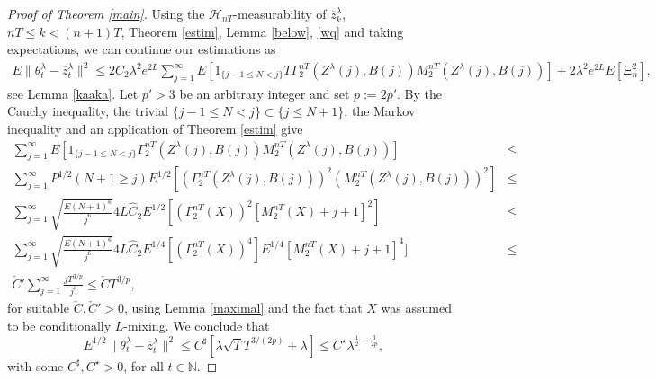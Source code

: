 \documentclass[a4paper]{article}
\begin{document}
\begin{proof}[ Proof of Theorem \ref{main}]
	
Using the $\mathcal{H}_{nT}$-measurability of $\overline{z}^{\lambda}_k$,
$nT\leq k<(n+1)T$, Theorem \ref{estim}, Lemma \ref{below}, \eqref{wq} and taking expectations, we can continue our estimations as
\begin{eqnarray*}
	E\| \theta^{\lambda}_{t}-\overline{z}^{\lambda}_{t}\|^2 \leq
	2\hat{C}_2\lambda^2 e^{2L}\sum_{j=1}^{\infty}E[1_{\{j-1\leq N <j\}}
	T\Gamma_2^{nT}(Z^{\lambda}(j),B(j))M_2^{nT}(Z^{\lambda}(j),B(j))] +	2\lambda^2 e^{2L}
	E\left[\Xi^2_{n}\right],
\end{eqnarray*}
see Lemma \ref{kaaka}. Let $p'>3$ be an arbitrary integer and set $p:=2p'$.
By the Cauchy inequality, the trivial $\{j-1\leq N < j\} \subset \{j\leq N+1\}$, the Markov inequality and
an application of Theorem \ref{estim} give
\begin{eqnarray*}
	\sum_{j=1}^{\infty}E[1_{\{j-1\leq N <j\}}
	\Gamma_2^{nT}(Z^{\lambda}(j),B(j))M_2^{nT}(Z^{\lambda}(j),B(j))] &\leq&\\
	\sum_{j=1}^{\infty} P^{1/2}(N+1\geq j)
	E^{1/2}[(\Gamma_2^{nT}(Z^{\lambda}(j),B(j)))^2(M_2^{nT}(Z^{\lambda}(j),B(j)))^2] &\leq&\\
	\sum_{j=1}^{\infty}\sqrt{\frac{E(N+1)^6}{j^6}}4L \hat{C}_2 E^{1/2}[(\Gamma^{nT}_2(X))^2  [M_2^{nT}(X)+j+1]^2] &\leq&\\
	\sum_{j=1}^{\infty}\sqrt{\frac{E(N+1)^6}{j^6}}4L \hat{C}_2
	E^{1/4}[(\Gamma^{nT}_2(X))^4]
	E^{1/4}[M_2^{nT}(X)+j+1]^4] &\leq&\\
	\check{C}'\sum_{j=1}^{\infty} \frac{jT^{3/p}}{j^3}
		\leq \check{C}T^{3/p},
\end{eqnarray*}
for suitable $\check{C}, \check{C}'>0$, using Lemma \ref{maximal}
and the fact that $X$ was assumed
to be conditionally $L$-mixing.  We conclude that
$$
E^{1/2}\| \theta^{\lambda}_{t}-\overline{z}_{t}^{\lambda}\|^2\leq C^{\sharp}[\lambda \sqrt{T}
	T^{3/(2p)}+\lambda]\leq C^{\star}\lambda^{\frac{1}{2} - \frac{3}{2p}},
$$
with some $C^{\sharp},C^{\star}>0$, for all $t\in\mathbb{N}$.


\end{proof}
\end{document}
